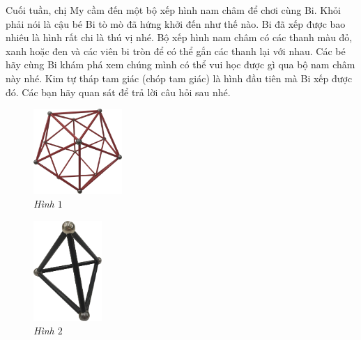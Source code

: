	\begin{multicols}{2}
		Cuối tuần, chị My cầm đến một bộ xếp hình nam châm để chơi cùng Bi. Khỏi phải nói là cậu bé Bi tò mò đã hứng khởi đến như thế nào. Bi đã xếp được bao nhiêu là hình rất chi là thú vị nhé.
		\vskip 0.1cm
		Bộ xếp hình nam châm có các thanh màu đỏ,  xanh hoặc đen và các viên bi tròn để có thể gắn các thanh lại với nhau.
		\vskip 0.1cm
		Các bé hãy cùng Bi khám phá xem chúng mình có thể vui học được gì qua bộ nam châm này nhé.
		\vskip 0.1cm
		Kim tự tháp tam giác (chóp tam giác) là hình đầu tiên mà Bi xếp được đó. Các bạn hãy quan sát để trả lời câu hỏi sau nhé.
		\begin{figure}[H]
			\centering
			\vspace*{5pt}
			\captionsetup{labelformat= empty, justification=centering}
			\includegraphics[width=0.3\textwidth]{1}
			\caption{\small\textit{Hình $1$}}
			\vspace*{-10pt}
		\end{figure}
		\begin{figure}[H]
			\centering
			\vspace*{5pt}
			\captionsetup{labelformat= empty, justification=centering}
			\includegraphics[width=0.23\textwidth]{2}
			\caption{\small\textit{Hình $2$}}
			\vspace*{-10pt}
		\end{figure}
	\end{multicols}
	
